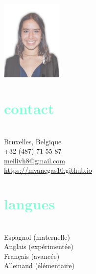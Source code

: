 \documentclass[francais]{cv-style}          %
\begin{document}
\lastupdated


\begin{aside}
\includegraphics[width=3cm]{pictures/me.png}
%
\vspace{2.5cm}
\section{\textcolor{aquamarine}{contact}}\\
\vspace{0.2cm}
Bruxelles, Belgique\\
\vspace{0.1cm}
+32 (487) 71 55 87\\
\vspace{0.1cm}
{\href{mailto:meilivh8@gmail.com}{\underline{meilivh8@gmail.com}}}\\
\vspace{0.1cm}
{\href{https://mvanegas10.github.io}{\underline{https://mvanegas10.github.io}}}\\
%
\vspace{2.5cm}
\section{\textcolor{aquamarine}{langues}}\\
\vspace{0.2cm}
Espagnol (maternelle)\\
\vspace{0.1cm}
Anglais (expérimentée)\\
\vspace{0.1cm}
Français (avancée)\\
\vspace{0.1cm}
Allemand (élémentaire)\\
%
\vspace{2.5cm}

\end{aside}
\end{document}
